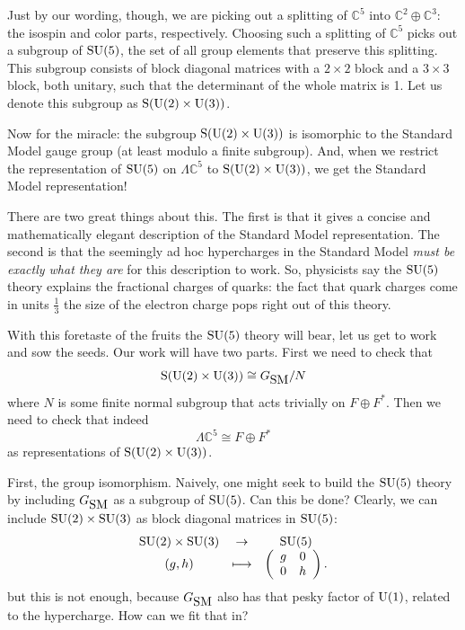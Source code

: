 \documentclass[12pt]{article}
\newcommand{\C}{{\mathbb C}}  %
\newcommand{\U}{{\rm U}}    %
\renewcommand{\S}{{\rm S}}    %
\newcommand{\SU}{{\rm SU}}    %
\newcommand{\Ex}{\Lambda} %
\newcommand{\iso}{\cong} %
\newcommand{\third}{\frac{1}{3}} %
\newcommand{\GSM}{{G_{\mbox{\rm SM}}}}  %
\begin{document}
Just by our wording, though, we are picking out a splitting of $\C^5$
into $\C^2 \oplus \C^3$: the isospin and color parts,
respectively. Choosing such a splitting of $\C^5$ picks out a subgroup
of $\SU(5)$, the set of all group elements that preserve this
splitting.  This subgroup consists of block diagonal matrices with a $2
\times 2$ block and a $3 \times 3$ block, both unitary, such that the
determinant of the whole matrix is 1.  Let us denote this subgroup as
$\S(\U(2) \times \U(3))$.

Now for the miracle: the subgroup $\S(\U(2) \times \U(3))$ is isomorphic
to the Standard Model gauge group (at least modulo a finite subgroup).
And, when we restrict the representation of $\SU(5)$ on $\Ex
\C^5$ to $\S(\U(2) \times \U(3))$, we get the Standard Model representation!

There are two great things about this.  The first is that it gives a
concise and mathematically elegant description of the Standard Model
representation.  The second is that the seemingly ad hoc hypercharges
in the Standard Model \emph{must be exactly what they are} for this
description to work.  So, physicists say the $\SU(5)$ theory explains
the fractional charges of quarks: the fact that quark charges come in
units $\third$ the size of the electron charge pops right out of this
theory.

With this foretaste of the fruits the $\SU(5)$ theory will bear, let
us get to work and sow the seeds.  Our work will have two
parts.  First we need to check that
\[ \S(\U(2) \times \U(3)) \iso \GSM/N \]
where $N$ is some finite normal subgroup that acts trivially on 
$F \oplus F^*$.  Then we need to check that indeed
\[ \Ex \C^5 \iso F \oplus F^* \]
as representations of $\S(\U(2) \times \U(3))$. 

First, the group isomorphism.  Naively, one might seek to build
the $\SU(5)$ theory by including $\GSM$ as a subgroup of $\SU(5)$. 
Can this be done?
Clearly, we can include $\SU(2) \times \SU(3)$ as block diagonal 
matrices in $\SU(5)$:
\[ \begin{array}{ccc}
   \SU(2) \times \SU(3) &\to& \SU(5) \\
   (g, h) &\longmapsto& 
\left( 
\begin{array}{cc}
g & 0 \\
0 & h
\end{array}
\right).
\end{array}
\]
but this is not enough, because $\GSM$ also has that pesky factor of
$\U(1)$, related to the hypercharge.  How can we fit that in?
\end{document}
